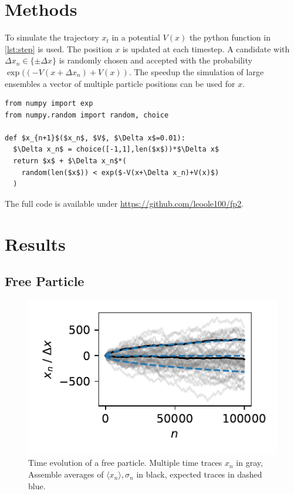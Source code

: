 \documentclass[
    parskip=half, 
    twoside=false,
    twocolumn=true,
    fontsize=11pt,
]{scrarticle}
\begin{document}
\section{Methods}
To simulate the trajectory $x_t$ in a potential $V(x)$ the python function in \autoref{lst:step} is used.
The position $x$ is updated at each timestep.
A candidate with $\Delta x_n \in \{\pm \Delta x\}$ is randomly chosen and accepted with the probability $\exp((-V(x+\Delta x_n)+V(x))$.
The speedup the simulation of large ensembles a vector of multiple particle positions can be used for $x$.

\begin{lstlisting}[caption={Python function used for time evolution.},label={lst:step},captionpos=b]
from numpy import exp
from numpy.random import random, choice

def $x_{n+1}$($x_n$, $V$, $\Delta x$=0.01):
  $\Delta x_n$ = choice([-1,1],len($x$))*$\Delta x$
  return $x$ + $\Delta x_n$*(
    random(len($x$)) < exp($-V(x+\Delta x_n)+V(x)$)
  )
\end{lstlisting}

The full code is available under \url{https://github.com/leoole100/fp2}.

\section{Results}
\subsection{Free Particle}
\begin{figure}
    \includegraphics{figures/01 time trace.pdf}
    \caption{
        Time evolution of a free particle.
        Multiple time traces $x_n$ in gray, Assemble averages of $\langle x_n\rangle, \sigma_n$ in black, expected traces in dashed blue.
    }
    \label{fig:pt1_trajectory}
\end{figure}
\end{document}

